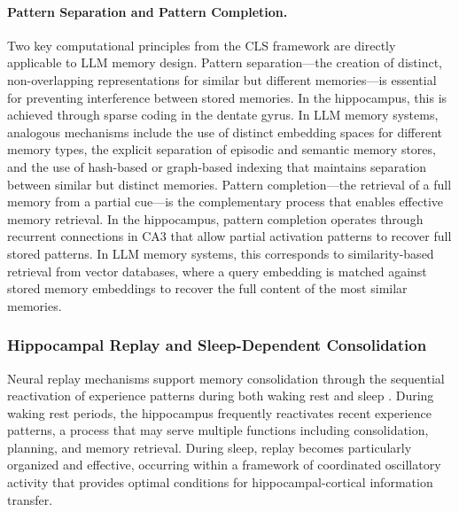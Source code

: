 \documentclass[11pt,letterpaper]{article}
\begin{document}
\paragraph{Pattern Separation and Pattern Completion.} Two key computational principles from the CLS framework are directly applicable to LLM memory design. Pattern separation---the creation of distinct, non-overlapping representations for similar but different memories---is essential for preventing interference between stored memories. In the hippocampus, this is achieved through sparse coding in the dentate gyrus. In LLM memory systems, analogous mechanisms include the use of distinct embedding spaces for different memory types, the explicit separation of episodic and semantic memory stores, and the use of hash-based or graph-based indexing that maintains separation between similar but distinct memories. Pattern completion---the retrieval of a full memory from a partial cue---is the complementary process that enables effective memory retrieval. In the hippocampus, pattern completion operates through recurrent connections in CA3 that allow partial activation patterns to recover full stored patterns. In LLM memory systems, this corresponds to similarity-based retrieval from vector databases, where a query embedding is matched against stored memory embeddings to recover the full content of the most similar memories.

\subsubsection{Hippocampal Replay and Sleep-Dependent Consolidation}

Neural replay mechanisms support memory consolidation through the sequential reactivation of experience patterns during both waking rest and sleep \cite{carr2011hippocampal, foster2017replay}. During waking rest periods, the hippocampus frequently reactivates recent experience patterns, a process that may serve multiple functions including consolidation, planning, and memory retrieval. During sleep, replay becomes particularly organized and effective, occurring within a framework of coordinated oscillatory activity that provides optimal conditions for hippocampal-cortical information transfer.
\end{document}
